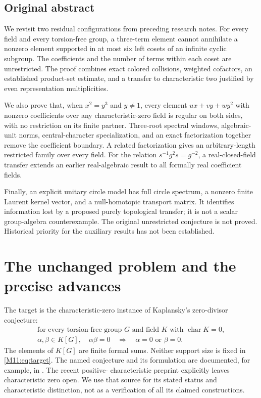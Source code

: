 \documentclass[11pt,a4paper,oneside]{report}
\theoremstyle{definition}
\theoremstyle{remark}
\begin{document}
\subsection*{Original abstract}
We revisit two residual configurations from preceding research notes.
For every field and every torsion-free group, a three-term element
cannot annihilate a nonzero element supported in at most six left
cosets of an infinite cyclic subgroup. The coefficients and the
number of terms within each coset are unrestricted. The proof combines
exact colored collisions, weighted cofactors, an established product-set
estimate, and a transfer to characteristic two justified by even
representation multiplicities.

We also prove that, when $x^2=y^3$ and $y\ne1$, every element
$ux+vy+wy^2$ with nonzero coefficients over any characteristic-zero
field is regular on both sides, with no restriction on its finite
partner. Three-root spectral windows, algebraic-unit norms,
central-character specialization, and an exact factorization together
remove the coefficient boundary. A related factorization gives an
arbitrary-length restricted family over every field. For the relation
$s^{-1}g^2s=g^{-2}$, a real-closed-field transfer extends an earlier
real-algebraic result to all formally real coefficient fields.

Finally, an explicit unitary circle model has full circle spectrum,
a nonzero finite Laurent kernel vector, and a null-homotopic transport
matrix. It identifies information lost by a proposed purely
topological transfer; it is not a scalar group-algebra counterexample.
The original unrestricted conjecture is not proved. Historical
priority for the auxiliary results has not been established.
\medskip
\section{The unchanged problem and the precise advances}

The target is the characteristic-zero instance of Kaplansky's
zero-divisor conjecture:
\begin{equation}\label{M11:eq:target}
\begin{gathered}
 \text{for every torsion-free group }G\text{ and field }K
 \text{ with }\operatorname{char}K=0,\\
 \alpha,\beta\in K[G],\quad \alpha\beta=0
 \quad\Longrightarrow\quad \alpha=0\text{ or }\beta=0.
\end{gathered}
\end{equation}
The elements of $K[G]$ are finite formal sums. Neither support size
is fixed in \eqref{M11:eq:target}. The named conjecture and its formulation
are documented, for example, in \cite{B:ATsmall}. The recent positive-
characteristic preprint \cite{B:Ivanov} explicitly leaves characteristic
zero open. We use that source for its stated status and characteristic
distinction, not as a verification of all its claimed constructions.
\end{document}
